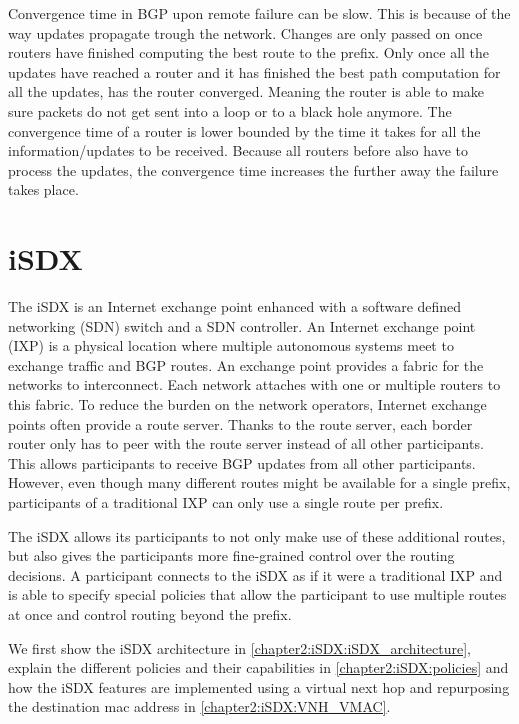 Convergence time in BGP upon remote failure can be slow.
This is because of the way updates propagate trough the network. Changes are only passed on once routers have finished computing the best route to the prefix. Only once all the updates have reached a router and it has finished the best path computation for all the updates, has the router converged. Meaning the router is able to make sure packets do not get sent into a loop or to a black hole anymore. The convergence time of a router is lower bounded by the time it takes for all the information/updates to be received. Because all routers before also have to process  the updates, the convergence time increases the further away the failure takes place. 


\section{\label{chapter2:iSDX}iSDX}

The iSDX is an Internet exchange point enhanced with a software defined networking (SDN) switch and a SDN controller.
An Internet exchange point (IXP) is a physical location where multiple autonomous systems meet to exchange traffic and BGP routes. An exchange point provides a fabric for the networks to interconnect. Each network attaches with one or multiple routers to this fabric. To reduce the burden on the network operators, Internet exchange points often provide a route server. Thanks to the route server, each border router only has to peer with the route server instead of all other participants. This allows participants to receive BGP updates from all other participants. However, even though many different routes might be available for a single prefix, participants of a traditional IXP can only use a single route per prefix.

The iSDX allows its participants to not only make use of these additional routes, but also gives the participants  more fine-grained control over the routing decisions. A participant connects to the iSDX as if it were a traditional IXP and is able to specify special policies that allow the participant to use multiple routes at once and control routing beyond the prefix.

We first show the iSDX architecture in \ref{chapter2:iSDX:iSDX_architecture}, explain the different policies and their capabilities in \ref{chapter2:iSDX:policies} and how the iSDX features are implemented using a virtual next hop and repurposing the destination mac address in \ref{chapter2:iSDX:VNH_VMAC}.

